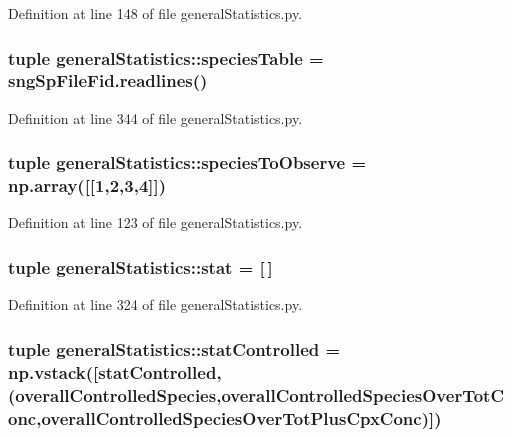 \-Definition at line 148 of file general\-Statistics.\-py.

\hypertarget{namespacegeneral_statistics_a1ae65ffff7c2a91a33059633266d7b4c}{
\subsubsection[{species\-Table}]{\setlength{\rightskip}{0pt plus 5cm}tuple {\bf general\-Statistics\-::species\-Table} = sng\-Sp\-File\-Fid.\-readlines()}}\label{namespacegeneral_statistics_a1ae65ffff7c2a91a33059633266d7b4c}


\-Definition at line 344 of file general\-Statistics.\-py.

\hypertarget{namespacegeneral_statistics_acfada06fea0c10e3f1eea8b9cdde37e3}{
\subsubsection[{species\-To\-Observe}]{\setlength{\rightskip}{0pt plus 5cm}tuple {\bf general\-Statistics\-::species\-To\-Observe} = np.\-array(\mbox{[}\mbox{[}1,2,3,4\mbox{]}\mbox{]})}}\label{namespacegeneral_statistics_acfada06fea0c10e3f1eea8b9cdde37e3}


\-Definition at line 123 of file general\-Statistics.\-py.

\hypertarget{namespacegeneral_statistics_a2d95f5d313dd8da87f5b5be5b4326a03}{
\subsubsection[{stat}]{\setlength{\rightskip}{0pt plus 5cm}tuple {\bf general\-Statistics\-::stat} = \mbox{[}$\,$\mbox{]}}}\label{namespacegeneral_statistics_a2d95f5d313dd8da87f5b5be5b4326a03}


\-Definition at line 324 of file general\-Statistics.\-py.

\hypertarget{namespacegeneral_statistics_ac380b2dd5c569341f6295d2e8e7337f0}{
\subsubsection[{stat\-Controlled}]{\setlength{\rightskip}{0pt plus 5cm}tuple {\bf general\-Statistics\-::stat\-Controlled} = np.\-vstack(\mbox{[}{\bf stat\-Controlled},({\bf overall\-Controlled\-Species},{\bf overall\-Controlled\-Species\-Over\-Tot\-Conc},{\bf overall\-Controlled\-Species\-Over\-Tot\-Plus\-Cpx\-Conc})\mbox{]})}}\label{namespacegeneral_statistics_ac380b2dd5c569341f6295d2e8e7337f0}


